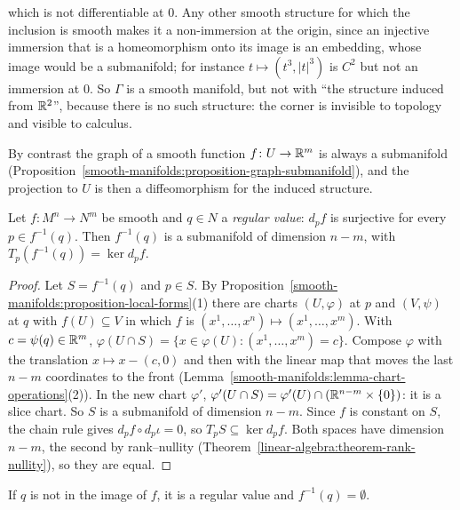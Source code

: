 \begin{example}
\begin{enumerate}
which is not differentiable at $0$. Any other smooth structure for which the inclusion is smooth makes it a non-immersion at the origin, since an injective immersion that is a homeomorphism onto its
image is an embedding, whose image would be a submanifold; for instance $t \mapsto (t^3, |t|^3)$ is $C^2$ but not an immersion at $0$. So $\Gamma$ is a smooth manifold, but not with ``the structure
induced from $\mathbb{R}^2$'', because there is no such structure: the corner is invisible to topology and visible to calculus.
\end{enumerate}
By contrast the graph of a smooth function $f \colon U \to \mathbb{R}^m$ is always a submanifold (Proposition~\ref{smooth-manifolds:proposition-graph-submanifold}), and the projection to $U$ is then a diffeomorphism
for the induced structure.
\end{example}

\begin{theorem}\label{smooth-manifolds:theorem-regular-value}
Let $f \colon M^n \to N^m$ be smooth and $q \in N$ a \emph{regular value}: $d_pf$ is surjective for every $p \in f^{-1}(q)$. Then $f^{-1}(q)$ is a submanifold of dimension $n - m$, with
$T_p(f^{-1}(q)) = \ker d_pf$.
\end{theorem}

\begin{proof}
Let $S = f^{-1}(q)$ and $p \in S$. By Proposition~\ref{smooth-manifolds:proposition-local-forms}(1) there are charts $(U, \varphi)$ at $p$ and $(V, \psi)$ at $q$
with $f(U) \subseteq V$ in which $f$ is $(x^1, \ldots, x^n) \mapsto (x^1, \ldots, x^m)$. With $c = \psi(q) \in \mathbb{R}^m$,
$\varphi(U \cap S) = \{x \in \varphi(U) : (x^1, \ldots, x^m) = c\}$. Compose $\varphi$ with the translation $x \mapsto x - (c, 0)$ and then with the linear map
that moves the last $n - m$ coordinates to the front (Lemma~\ref{smooth-manifolds:lemma-chart-operations}(2)). In the new chart $\varphi'$,
$\varphi'(U \cap S) = \varphi'(U) \cap (\mathbb{R}^{n-m} \times \{0\})$: it is a slice chart. So $S$ is a submanifold of dimension $n - m$. Since $f$ is constant on $S$, the chain
rule gives $d_pf \circ d_p\iota = 0$, so $T_pS \subseteq \ker d_pf$. Both spaces have dimension $n - m$, the second by rank--nullity
(Theorem~\ref{linear-algebra:theorem-rank-nullity}), so they are equal.
\end{proof}

If $q$ is not in the image of $f$, it is a regular value and $f^{-1}(q) = \emptyset$.


